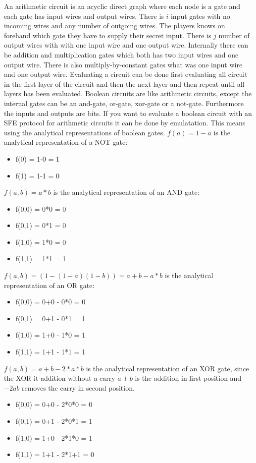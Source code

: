 An arithmetic circuit is an acyclic direct graph where each node is a gate and each gate has input wires and output wires. There is $i$ input gates with no incoming wires and any number of outgoing wires. The players knows on forehand which gate they have to supply their secret input. There is $j$ number of output wires with with one input wire and one output wire. Internally there can be addition and multiplication gates which both has two input wires and one output wire. There is also multiply-by-constant gates what was one input wire and one output wire. Evaluating a circuit can be done first evaluating all circuit in the first layer of the circuit and then the next layer and then repeat until all layers has been evaluated. 
Boolean circuits are like arithmetic circuits, except the internal gates can be an and-gate, or-gate, xor-gate or a not-gate. Furthermore the inputs and outputs are bits. If you want to evaluate a boolean circuit with an SFE protocol for arithmetic circuits it can be done by emulatation. This means using the analytical representations of boolean gates. 
$f(a) = 1-a$ is the analytical representation of a NOT gate:
     \begin{itemize}
        \item f(0) = 1-0 = 1
        \item f(1) = 1-1 = 0
    \end{itemize}
$f(a,b) = a*b$ is the analytical representation of an AND gate:
    \begin{itemize}
        \item f(0,0) = 0*0 = 0
        \item f(0,1) = 0*1 = 0
        \item f(1,0) = 1*0 = 0
        \item f(1,1) = 1*1 = 1
    \end{itemize}
$f(a,b) = (1-(1-a)(1-b)) = a + b - a*b$ is the analytical representation of an OR gate:                   \begin{itemize}
        \item f(0,0) = 0+0 - 0*0 = 0
        \item f(0,1) = 0+1 - 0*1 = 1
        \item f(1,0) = 1+0 - 1*0 = 1
        \item f(1,1) = 1+1 - 1*1 = 1
    \end{itemize}
$f(a,b) = a + b - 2*a*b$ is the analytical representation of an XOR gate, since the XOR it addition without a carry $a+b$ is the addition in first position and $-2ab$ removes the carry in second position.
    \begin{itemize}
        \item f(0,0) = 0+0 - 2*0*0 = 0
        \item f(0,1) = 0+1 - 2*0*1 = 1
        \item f(1,0) = 1+0 - 2*1*0 = 1
        \item f(1,1) = 1+1 - 2*1+1 = 0
    \end{itemize}


